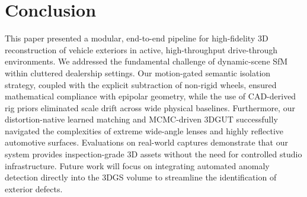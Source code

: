 \documentclass[letterpaper, 10 pt, conference]{ieeeconf}  %
\begin{document}



\section{Conclusion}
\label{sec:conclusion}

This paper presented a modular, end-to-end pipeline for high-fidelity 3D reconstruction of vehicle exteriors in active, high-throughput drive-through environments. We addressed the fundamental challenge of dynamic-scene SfM within cluttered dealership settings. Our motion-gated semantic isolation strategy, coupled with the explicit subtraction of non-rigid wheels, ensured mathematical compliance with epipolar geometry, while the use of CAD-derived rig priors eliminated scale drift across wide physical baselines. Furthermore, our distortion-native learned matching and MCMC-driven 3DGUT successfully navigated the complexities of extreme wide-angle lenses and highly reflective automotive surfaces. Evaluations on real-world captures demonstrate that our system provides inspection-grade 3D assets without the need for controlled studio infrastructure. Future work will focus on integrating automated anomaly detection directly into the 3DGS volume to streamline the identification of exterior defects.
\end{document}
